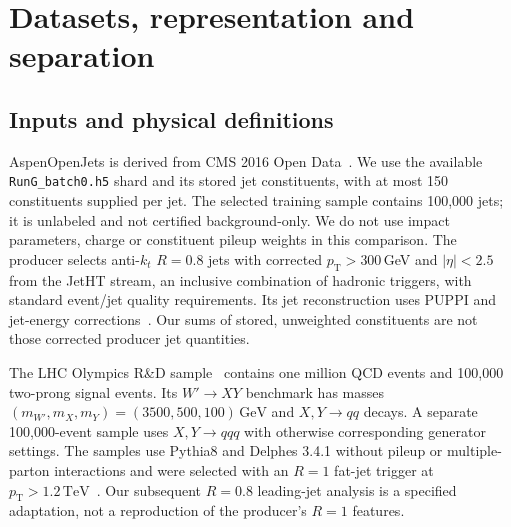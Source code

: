 \documentclass[11pt,a4paper]{article}
\newcommand{\pt}{p_{\mathrm T}}
\begin{document}
\section{Datasets, representation and separation}
\subsection{Inputs and physical definitions}
AspenOpenJets is derived from CMS 2016 Open Data~\cite{aspen}. We use the available
\texttt{RunG\_batch0.h5} shard and its stored jet constituents, with at most 150
constituents supplied per jet. The selected training sample contains 100,000 jets;
it is unlabeled and not certified background-only. We do not use impact parameters,
charge or constituent pileup weights in this comparison.
The producer selects anti-$k_t$ $R=0.8$ jets with corrected $\pt>300$\,GeV and
$|\eta|<2.5$ from the JetHT stream, an inclusive combination of hadronic triggers,
with standard event/jet quality requirements. Its jet reconstruction uses PUPPI
and jet-energy corrections~\cite{aspen}. Our sums of stored, unweighted constituents
are not those corrected producer jet quantities.

The LHC Olympics R\&D sample~\cite{lhco,lhcocommunity} contains one million QCD events and
100,000 two-prong signal events. Its $W'\to XY$ benchmark has masses
$(m_{W'},m_X,m_Y)=(3500,500,100)\,\mathrm{GeV}$ and $X,Y\to qq$ decays.
A separate 100,000-event sample uses $X,Y\to qqq$ with otherwise corresponding
generator settings. The samples use Pythia8 and Delphes 3.4.1 without pileup or
multiple-parton interactions and were selected with an $R=1$ fat-jet trigger at
$\pt>1.2\,\mathrm{TeV}$~\cite{lhco}. Our subsequent $R=0.8$ leading-jet analysis
is a specified adaptation, not a reproduction of the producer's $R=1$ features.
\end{document}
